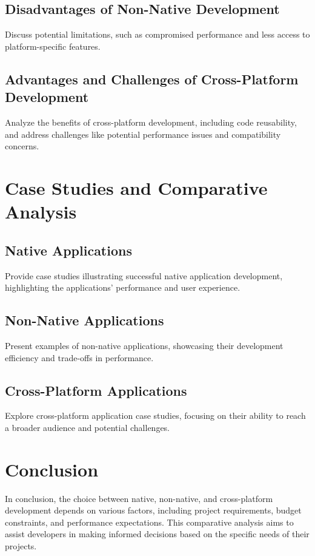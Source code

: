 \documentclass[conference]{IEEEtran}
\begin{document}
	\subsection{Disadvantages of Non-Native Development}
	Discuss potential limitations, such as compromised performance and less access to platform-specific features.
	
	\subsection{Advantages and Challenges of Cross-Platform Development}
	Analyze the benefits of cross-platform development, including code reusability, and address challenges like potential performance issues and compatibility concerns.
	
	\section{Case Studies and Comparative Analysis}
	\subsection{Native Applications}
	Provide case studies illustrating successful native application development, highlighting the applications' performance and user experience.
	
	\subsection{Non-Native Applications}
	Present examples of non-native applications, showcasing their development efficiency and trade-offs in performance.
	
	\subsection{Cross-Platform Applications}
	Explore cross-platform application case studies, focusing on their ability to reach a broader audience and potential challenges.
	
	\section{Conclusion}
	In conclusion, the choice between native, non-native, and cross-platform development depends on various factors, including project requirements, budget constraints, and performance expectations. This comparative analysis aims to assist developers in making informed decisions based on the specific needs of their projects.
	
\end{document}

